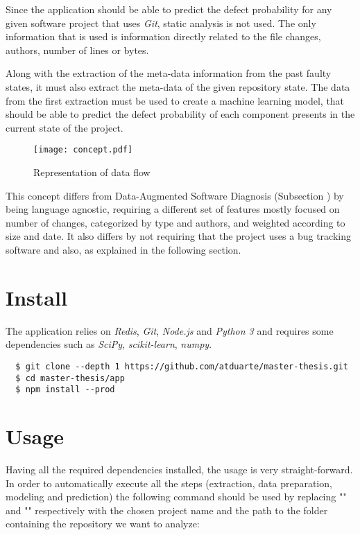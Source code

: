 Since the application should be able to predict the defect probability for any given software project that uses \emph{Git}, static analysis is not used. 
The only information that is used is information directly related to the file changes, authors, number of lines or bytes.

Along with the extraction of the meta-data information from the past faulty states, it must also extract the meta-data of the given repository state. The data from the first extraction must be used to create a machine learning model, that should be able to predict the defect probability of each component presents in the current state of the project.
%
\begin{figure}[ht]
  \begin{center}
    \leavevmode
    \texttt{[image: concept.pdf]}
    \caption{Representation of data flow}
    \label{fig:concept}
  \end{center}
\end{figure}

This concept differs from Data-Augmented Software Diagnosis (Subsection \label{subsec:elmishali}) by being language agnostic, requiring a different set of features mostly focused on number of changes, categorized by type and authors, and weighted according to size and date. It also differs by not requiring that the project uses a bug tracking software and also, as explained in the following section. 

\section{Install}

The application relies on \emph{Redis}, \emph{Git}, \emph{Node.js} and \emph{Python 3} and requires some dependencies such as \emph{SciPy}, \emph{scikit-learn}, \emph{numpy}.

\begin{lstlisting}
  $ git clone --depth 1 https://github.com/atduarte/master-thesis.git
  $ cd master-thesis/app
  $ npm install --prod
\end{lstlisting}

\section{Usage}

Having all the required dependencies installed, the usage is very straight-forward.
In order to automatically execute all the steps (extraction, data preparation, modeling and prediction) the following command should be used
by replacing "" and "" respectively with
the chosen project name and the path to the folder containing the repository we want to analyze:

